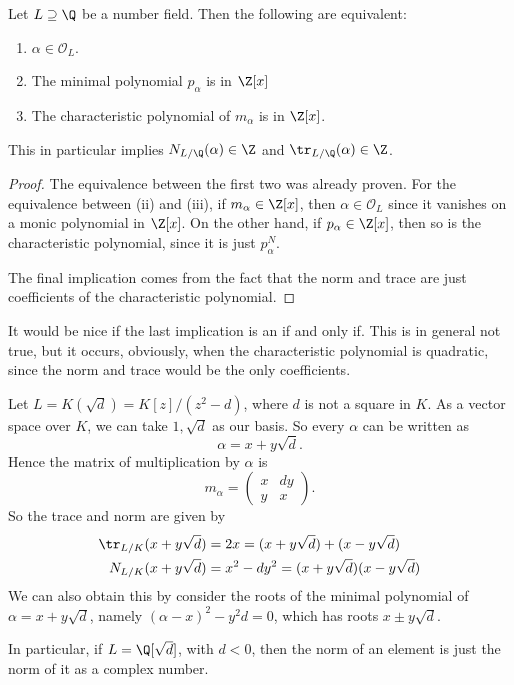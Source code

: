 \documentclass[a4paper]{article}
\begin{document}
\begin{cor}
  Let $L \supseteq \Q$ be a number field. Then the following are equivalent:
  \begin{enumerate}
    \item $\alpha \in \mathcal{O}_L$.
    \item The minimal polynomial $p_\alpha$ is in $\Z[x]$
    \item The characteristic polynomial of $m_\alpha$ is in $\Z[x]$.
  \end{enumerate}
  This in particular implies $N_{L/\Q}(\alpha) \in \Z$ and $\tr_{L/\Q}(\alpha) \in \Z$.
\end{cor}

\begin{proof}
  The equivalence between the first two was already proven. For the equivalence between (ii) and (iii), if $m_\alpha \in \Z[x]$, then $\alpha \in \mathcal{O}_L$ since it vanishes on a monic polynomial in $\Z[x]$. On the other hand, if $p_\alpha \in \Z[x]$, then so is the characteristic polynomial, since it is just $p_\alpha^N$.

  The final implication comes from the fact that the norm and trace are just coefficients of the characteristic polynomial.
\end{proof}

It would be nice if the last implication is an if and only if. This is in general not true, but it occurs, obviously, when the characteristic polynomial is quadratic, since the norm and trace would be the only coefficients.
\begin{eg}
  Let $L = K(\sqrt{d}) = K[z]/(z^2 - d)$, where $d$ is not a square in $K$. As a vector space over $K$, we can take $1, \sqrt{d}$ as our basis. So every $\alpha$ can be written as
  \[
    \alpha = x + y\sqrt{d}.
  \]
  Hence the matrix of multiplication by $\alpha$ is
  \[
    m_\alpha =
    \begin{pmatrix}
      x & dy\\
      y & x
    \end{pmatrix}.
  \]
  So the trace and norm are given by
  \begin{align*}
    \tr_{L/K} (x + y\sqrt{d}) &= 2x = (x + y\sqrt{d}) + (x - y\sqrt{d})\\
    N_{L/K} (x + y \sqrt{d}) &= x^2 - dy^2 = (x + y\sqrt{d})(x- y\sqrt{d})
  \end{align*}
  We can also obtain this by consider the roots of the minimal polynomial of $\alpha = x + y \sqrt{d}$, namely $(\alpha - x)^2 - y^2 d = 0$, which has roots $x \pm y \sqrt{d}$.
\end{eg}
In particular, if $L = \Q[\sqrt{d}]$, with $d < 0$, then the norm of an element is just the norm of it as a complex number.
\end{document}
